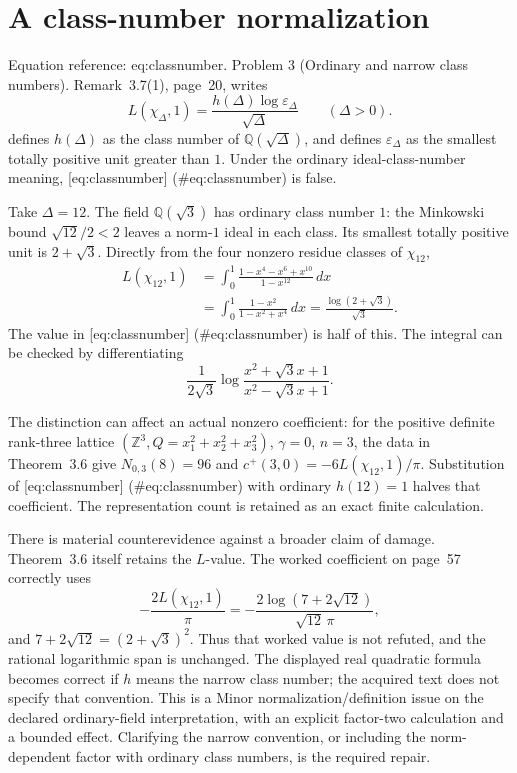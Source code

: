 \documentclass[10pt]{article}
\begin{document}
\section*{A class-number normalization}
Equation reference: eq:classnumber. Problem 3 (Ordinary and narrow class numbers).  Remark 3.7(1), page 20, writes \[
 L(\chi_\Delta,1)=
 \frac{h(\Delta)\log\varepsilon_\Delta}{\sqrt\Delta}
 \qquad(\Delta>0).\] defines \(h(\Delta)\) as the class number of \(\mathbb Q(\sqrt\Delta)\), and defines \(\varepsilon_\Delta\) as the smallest totally positive unit greater than \(1\). Under the ordinary ideal-class-number meaning, [eq:classnumber] (\#eq:classnumber) is false.\par
Take \(\Delta=12\). The field \(\mathbb Q(\sqrt3)\) has ordinary class number \(1\): the Minkowski bound \(\sqrt{12}/2<2\) leaves a norm-\(1\) ideal in each class. Its smallest totally positive unit is \(2+\sqrt3\). Directly from the four nonzero residue classes of \(\chi_{12}\), \[\begin{aligned}
 L(\chi_{12},1)
 &=\int_0^1\frac{1-x^4-x^6+x^{10}}{1-x^{12}}\,dx\\
 &=\int_0^1\frac{1-x^2}{1-x^2+x^4}\,dx
   =\frac{\log(2+\sqrt3)}{\sqrt3}.\end{aligned}\] The value in [eq:classnumber] (\#eq:classnumber) is half of this. The integral can be checked by differentiating \[\frac1{2\sqrt3}
 \log\frac{x^2+\sqrt3x+1}{x^2-\sqrt3x+1}.\]\par
The distinction can affect an actual nonzero coefficient: for the positive definite rank-three lattice \((\mathbb Z^3,Q=x_1^2+x_2^2+x_3^2)\), \(\gamma=0\), \(n=3\), the data in Theorem 3.6 give \(N_{0,3}(8)=96\) and \(c^+(3,0)=-6L(\chi_{12},1)/\pi\). Substitution of [eq:classnumber] (\#eq:classnumber) with ordinary \(h(12)=1\) halves that coefficient. The representation count is retained as an exact finite calculation.\par
There is material counterevidence against a broader claim of damage. Theorem 3.6 itself retains the \(L\)-value. The worked coefficient on page 57 correctly uses \[-\frac{2L(\chi_{12},1)}{\pi}
 =-\frac{2\log(7+2\sqrt{12})}{\sqrt{12}\,\pi},\] and \(7+2\sqrt{12}=(2+\sqrt3)^2\). Thus that worked value is not refuted, and the rational logarithmic span is unchanged. The displayed real quadratic formula becomes correct if \(h\) means the narrow class number; the acquired text does not specify that convention. This is a Minor normalization/definition issue on the declared ordinary-field interpretation, with an explicit factor-two calculation and a bounded effect. Clarifying the narrow convention, or including the norm-dependent factor with ordinary class numbers, is the required repair.\par
\end{document}

